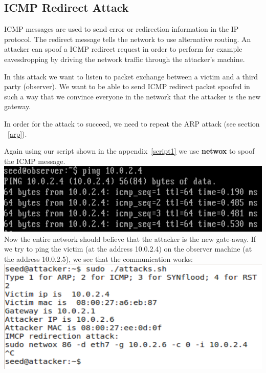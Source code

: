 \documentclass[12pt, a4paper, pdflatex]{article}
\begin{document}
\subsection{ICMP Redirect Attack}

ICMP messages are used to send error or redirection information in the IP protocol. The redirect message tells the network to use alternative routing. An attacker can spoof a ICMP redirect request in order to perform for example eavesdropping by driving the network traffic through the attacker's machine.

In this attack we want to listen to packet exchange between a victim and a third party (observer). We want to be able to send ICMP redirect packet spoofed in such a way that we convince everyone in the network that the attacker is the new gateway.

In order for the attack to succeed, we need to repeat the ARP attack (see section ~\ref{arp}).

Again using our script shown in the appendix~\ref{script1} we use \textbf{netwox} to spoof the ICMP message.\\

\includegraphics{gfx/imcp-ping}\\

Now the entire network should believe that the attacker is the new gate-away. If we try to ping the victim (at the address 10.0.2.4) on the observer machine (at the address 10.0.2.5), we see that the communication works:\\

\includegraphics{gfx/imcp-netwox}\\
\end{document}
